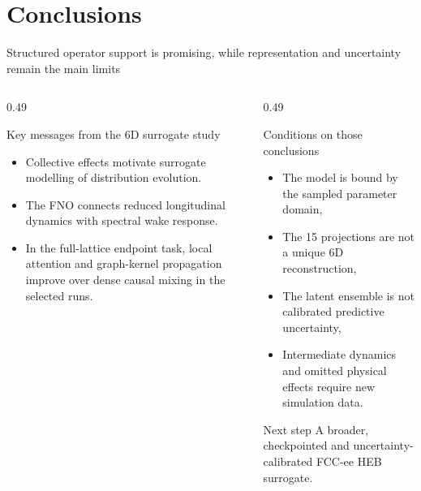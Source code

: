 \section{Conclusions}
\begin{frame}[t,shrink=5]{Structured operator support is promising, while representation and uncertainty remain the main limits}
\begin{columns}[T,onlytextwidth]
\begin{column}{0.49\textwidth}
\begin{block}{Key messages from the 6D surrogate study}
\begin{itemize}
\item Collective effects motivate surrogate modelling of distribution evolution.
\item The FNO connects reduced longitudinal dynamics with spectral wake response.
\item In the full-lattice endpoint task, local attention and graph-kernel propagation improve over dense causal mixing in the selected runs.
\end{itemize}
\end{block}

\end{column}
\begin{column}{0.49\textwidth}
\begin{block}{Conditions on those conclusions}
\begin{itemize}
\item The model is bound by the sampled parameter domain,
\item The 15 projections are not a unique 6D reconstruction,
\item The latent ensemble is not calibrated predictive uncertainty,
\item Intermediate dynamics and omitted physical effects require new simulation data.
\end{itemize}
\end{block}
\begin{alertblock}{Next step}
A broader, checkpointed and uncertainty-calibrated FCC-ee HEB surrogate.
\end{alertblock}

\end{column}
\end{columns}


\end{frame}

